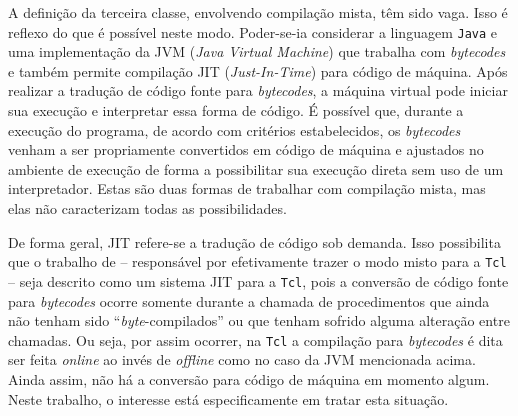A definição da terceira classe, envolvendo compilação
mista, têm sido vaga. Isso é reflexo do que é possível neste
modo. Poder-se-ia considerar a linguagem \texttt{Java} e uma
implementação da JVM (\textit{Java Virtual Machine}) \cite{jvmspec} que trabalha com
\textit{bytecodes} e também permite compilação JIT (\textit{Just-In-Time})
para código de máquina. Após realizar a
tradução de código fonte para \textit{bytecodes}, a máquina virtual
pode iniciar sua execução e interpretar essa forma de código.
É possível que, durante a execução do programa,
de acordo com critérios estabelecidos, os \textit{bytecodes} venham a
ser propriamente convertidos em código de máquina e ajustados no
ambiente de execução de forma
a possibilitar sua execução direta sem uso de um interpretador. Estas
são duas formas de trabalhar com compilação mista, mas elas não
caracterizam todas as possibilidades.%

De forma geral, JIT refere-se a tradução de código sob demanda. Isso
possibilita que o trabalho de  -- responsável
por efetivamente trazer o modo misto para a \texttt{Tcl} -- seja descrito
como um sistema JIT para a \texttt{Tcl}, pois a conversão de código
fonte para \textit{bytecodes} ocorre somente durante a chamada de
procedimentos que ainda não tenham sido ``\textit{byte}-compilados''
ou que tenham sofrido alguma alteração entre chamadas. Ou seja, por
assim ocorrer, na
\texttt{Tcl} a compilação para \textit{bytecodes} é dita ser feita
\textit{online} ao invés de
\textit{offline} como no caso da JVM
mencionada acima. Ainda assim, não
há a conversão para código de máquina em momento algum. Neste
trabalho, o interesse está especificamente em tratar esta situação.


